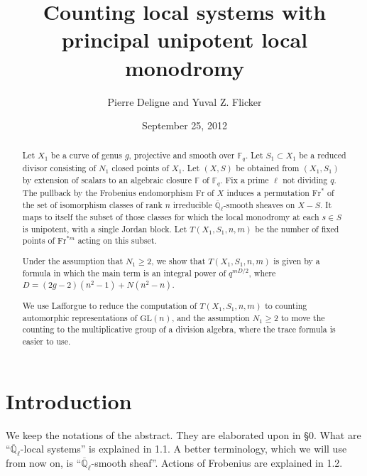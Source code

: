 \documentclass[11pt,a4paper]{article}
\theoremstyle{plain}
\theoremstyle{definition}
\newcommand{\Ql}{\overline{\mathbb{Q}}_\ell}
\newcommand{\Fq}{\mathbb{F}_q}
\newcommand{\F}{\mathbb{F}}
\newcommand{\GL}{\mathrm{GL}}
\newcommand{\Fr}{\mathrm{Fr}}
\begin{document}
\title{Counting local systems with principal unipotent local monodromy}
\author{Pierre Deligne and Yuval Z. Flicker}
\date{September 25, 2012}
\maketitle

\begin{abstract}
Let $X_1$ be a curve of genus $g$, projective and smooth over $\Fq$. Let $S_1 \subset X_1$ be a reduced divisor consisting of $N_1$ closed points of $X_1$. Let $(X,S)$ be obtained from $(X_1,S_1)$ by extension of scalars to an algebraic closure $\F$ of $\Fq$. Fix a prime $\ell$ not dividing $q$. The pullback by the Frobenius endomorphism $\Fr$ of $X$ induces a permutation $\Fr^*$ of the set of isomorphism classes of rank $n$ irreducible $\Ql$-smooth sheaves on $X - S$. It maps to itself the subset of those classes for which the local monodromy at each $s \in S$ is unipotent, with a single Jordan block. Let $T(X_1,S_1,n,m)$ be the number of fixed points of $\Fr^{*m}$ acting on this subset.

Under the assumption that $N_1 \geq 2$, we show that $T(X_1,S_1,n,m)$ is given by a formula in which the main term is an integral power of $q^{mD/2}$, where $D = (2g-2)(n^2-1) + N(n^2-n)$.

We use Lafforgue to reduce the computation of $T(X_1,S_1,n,m)$ to counting automorphic representations of $\GL(n)$, and the assumption $N_1 \geq 2$ to move the counting to the multiplicative group of a division algebra, where the trace formula is easier to use.
\end{abstract}

\tableofcontents

\section*{Introduction}

We keep the notations of the abstract. They are elaborated upon in \S 0. What are ``$\Ql$-local systems'' is explained in 1.1. A better terminology, which we will use from now on, is ``$\Ql$-smooth sheaf''. Actions of Frobenius are explained in 1.2.
\end{document}
